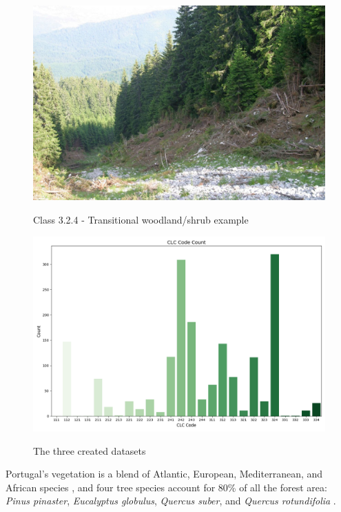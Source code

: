 \begin{figure}[H]
	\caption{Class 3.2.4 - Transitional woodland/shrub example \cite{kosztra_avalanche_2024}}
	\centering
	\includegraphics[width=\textwidth]{chapter-images/5_1-eda/324_RO_avalanche_damage_IMG_5664_small.jpg}
	\label{fig:species_count}
\end{figure}


\begin{figure}[H]
	\caption{The three created datasets}
	\centering
	\includegraphics[width=\textwidth]{chapter-images/5_1-eda/clc_code_count.png}
	\label{fig:montly_fire_count}
\end{figure}


Portugal's vegetation is a blend of Atlantic, European, Mediterranean, and African species \cite{britannica_portugal_climate}, and four tree species account for 80\% of all the forest area: \textit{Pinus pinaster}, \textit{Eucalyptus globulus}, \textit{Quercus suber}, and \textit{Quercus rotundifolia} \cite{Marques2011}.


